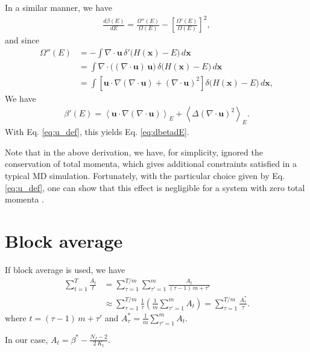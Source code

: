 \documentclass[reprint]{revtex4-1}
\begin{document}
In a similar manner, we have
%
\begin{align*}
  \frac
  {
    d \beta(E)
  }
  {
    d E
  }
  =
  \frac
  {
    \Omega''(E)
  }
  {
    \Omega(E)
  }
  -
  \left[
    \frac
    {
      \Omega'(E)
    }
    {
      \Omega(E)
    }
  \right]^2
  ,
\end{align*}
%
and since
%
\begin{align*}
  \Omega''(E)
  &= -\int \nabla \cdot \mathbf u \,
     \delta'\bigl( H(\mathbf x) - E \bigr) \, d\mathbf x
  \\
  &= \int
     \nabla \cdot \bigl( (\nabla \cdot \mathbf u) \, \mathbf u \bigr) \,
     \delta\bigl( H(\mathbf x) - E \bigr) \, d\mathbf x
  \\
  &= \int
     \left[
     \mathbf u \cdot \nabla (\nabla \cdot \mathbf u)
     +
     (\nabla \cdot \mathbf u)^2
     \right]
     \delta\bigl( H(\mathbf x) - E \bigr) \, d\mathbf x
  ,
\end{align*}
%
We have
%
\begin{align*}
  \beta'(E)
  =
  \left\langle
     \mathbf u \cdot \nabla (\nabla \cdot \mathbf u)
  \right\rangle_E
  +
  \left\langle
    \Delta (\nabla \cdot \mathbf u)^2
  \right\rangle_E
  .
\end{align*}
%
With Eq. \eqref{eq:u_def},
this yields Eq. \eqref{eq:dbetadE}.

Note that in the above derivation,
we have, for simplicity, ignored the conservation
of total momenta\cite{shirts2006, uline2008},
which gives additional constraints satisfied in a typical MD simulation.
%
Fortunately, with the particular choice given by Eq. \eqref{eq:u_def},
one can show that this effect is negligible for a system
with zero total momenta\cite{uline2008}
\big[a key observation here is
that for the total momenta $P_\nu = \sum_{i} p_{i, \nu}$,
$\nu = x,y,z$, we have
$\mathbf u \cdot \nabla P_\nu = P_\nu/(2K) = 0$ \big].



\section{\label{sec:block}
Block average}



If block average is used, we have
%
\begin{align*}
  \sum_{t = 1}^T \frac{ A_t } { t }
  &=
  \sum_{\tau = 1}^{T/m}
  \sum_{\tau' = 1}^{m}
  \frac{ A_t } { (\tau - 1) \, m + \tau' }
  \\
  &\approx
  \sum_{\tau = 1}^{T/m}
  \frac{ 1 } { \tau }
  \left(
    \frac 1 m
    \sum_{\tau' = 1}^m
    A_t
  \right)
  =
  \sum_{\tau = 1}^{T/m}
  \frac{ A^*_\tau } { \tau }
  .
\end{align*}
%
where
$t = (\tau - 1) \, m + \tau'$
and
$
A^*_\tau = \frac 1 m
\sum_{\tau' = 1}^m A_t.
$

In our case,
$
A_t = \beta^* - \frac{ N_f - 2 } { 2 \, K_t }.
$



%

\end{document}
